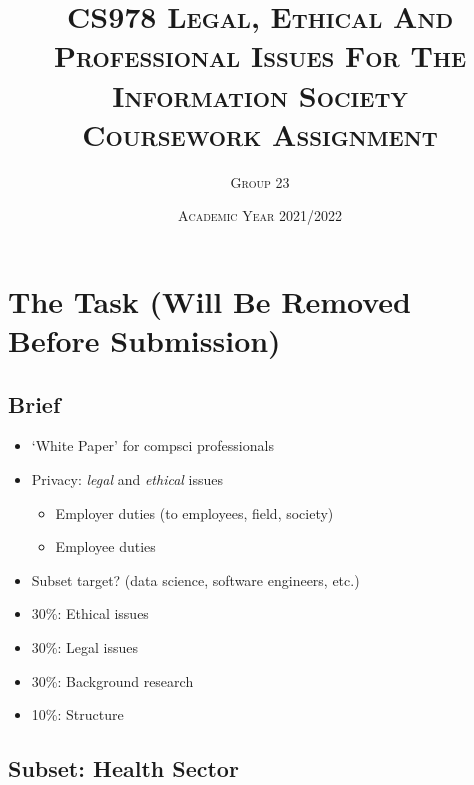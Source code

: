 \documentclass[11pt, english]{article}
\begin{document}

	\title{\textsc{CS978 Legal, Ethical And Professional Issues For The Information Society\\ Coursework Assignment}}
	\author{\textsc{Group 23}}
	\date{\textsc{Academic Year 2021/2022}}
        \maketitle

\newpage


	\renewcommand{\contentsname}{Table of Contents}

	\tableofcontents

\newpage


\section*{The Task (Will Be Removed Before Submission)}

	\subsection*{Brief}

	\begin{itemize}
	\setlength\itemsep{0cm}
		\item `White Paper' for compsci professionals
		\item Privacy: \textit{legal} and \textit{ethical} issues
		\begin{itemize}
			\item Employer duties (to employees, field, society)
			\item Employee duties
		\end{itemize}
		\item Subset target? (data science, software engineers, etc.)
	\end{itemize}

	\begin{itemize}
	\setlength\itemsep{0cm}
		\item 30\%: Ethical issues
		\item 30\%: Legal issues
		\item 30\%: Background research
		\item 10\%: Structure
	\end{itemize}

	\subsection*{Subset: Health Sector}
\end{document}
